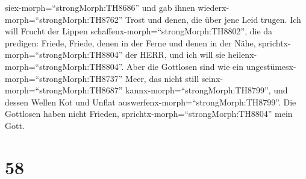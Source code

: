 siex-morph=``strongMorph:TH8686'' und gab ihnen
wiederx-morph=``strongMorph:TH8762'' Trost und denen, die über jene Leid
trugen.  Ich will Frucht der Lippen
schaffenx-morph=``strongMorph:TH8802'', die da predigen: Friede, Friede,
denen in der Ferne und denen in der Nähe,
sprichtx-morph=``strongMorph:TH8804'' der HERR, und ich will sie
heilenx-morph=``strongMorph:TH8804''.  Aber die Gottlosen
sind wie ein ungestümesx-morph=``strongMorph:TH8737'' Meer, das nicht
still seinx-morph=``strongMorph:TH8687''
kannx-morph=``strongMorph:TH8799'', und dessen Wellen Kot und Unflat
auswerfenx-morph=``strongMorph:TH8799''.  Die Gottlosen
haben nicht Frieden, sprichtx-morph=``strongMorph:TH8804'' mein Gott.

\hypertarget{section-57}{%
\section{58}\label{section-57}}

